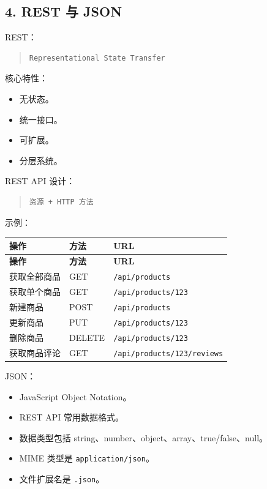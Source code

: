 \documentclass[UTF8,zihao=-4]{ctexart}
\begin{document}
\subsection{4. REST 与 JSON}

REST：

\begin{quote}
\footnotesize
\begin{verbatim}
Representational State Transfer
\end{verbatim}
\end{quote}

核心特性：

\begin{itemize}
\item 无状态。
\item 统一接口。
\item 可扩展。
\item 分层系统。
\end{itemize}

REST API 设计：

\begin{quote}
\footnotesize
\begin{verbatim}
资源 + HTTP 方法
\end{verbatim}
\end{quote}

示例：

{
\footnotesize
\begin{longtable}{|>{\raggedright\arraybackslash}p{}|>{\raggedright\arraybackslash}p{}|>{\raggedright\arraybackslash}p{}|}
\hline
\textbf{操作} & \textbf{方法} & \textbf{URL} \\
\hline
\endfirsthead
\hline
\textbf{操作} & \textbf{方法} & \textbf{URL} \\
\hline
\endhead
获取全部商品 & GET & \texttt{/api/products} \\
\hline
获取单个商品 & GET & \texttt{/api/products/123} \\
\hline
新建商品 & POST & \texttt{/api/products} \\
\hline
更新商品 & PUT & \texttt{/api/products/123} \\
\hline
删除商品 & DELETE & \texttt{/api/products/123} \\
\hline
获取商品评论 & GET & \texttt{/api/products/123/reviews} \\
\hline
\end{longtable}
}


JSON：

\begin{itemize}
\item JavaScript Object Notation。
\item REST API 常用数据格式。
\item 数据类型包括 string、number、object、array、true/false、null。
\item MIME 类型是 \texttt{application/json}。
\item 文件扩展名是 \texttt{.json}。
\end{itemize}
\end{document}
